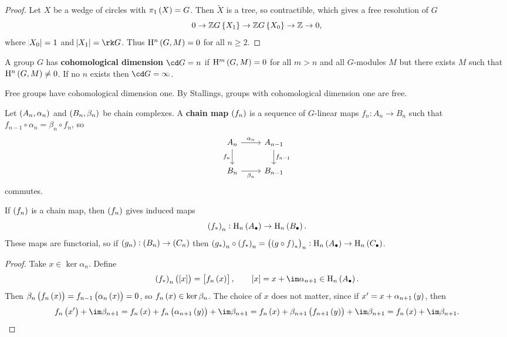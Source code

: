 \begin{proof}
Let $ X $ be a wedge of circles with $ \pi_1\br{X} = G $. Then $ \widetilde{X} $ is a tree, so contractible, which gives a free resolution of $ G $
$$ 0 \to \ZZ G\cbr{X_1} \to \ZZ G\cbr{X_0} \to \ZZ \to 0, $$
where $ \abs{X_0} = 1 $ and $ \abs{X_1} = \rk G $. Thus $ \H^n\br{G, M} = 0 $ for all $ n \ge 2 $.
\end{proof}

\begin{definition}
A group $ G $ has \textbf{cohomological dimension} $ \cd G = n $ if $ \H^m\br{G, M} = 0 $ for all $ m > n $ and all $ G $-modules $ M $ but there exists $ M $ such that $ \H^n\br{G, M} \ne 0 $. If no $ n $ exists then $ \cd G = \infty $.
\end{definition}

Free groups have cohomological dimension one. By Stallings, groups with cohomological dimension one are free.

\begin{definition}
Let $ \br{A_n, \alpha_n} $ and $ \br{B_n, \beta_n} $ be chain complexes. A \textbf{chain map} $ \br{f_n} $ is a sequence of $ G $-linear maps $ f_n : A_n \to B_n $ such that $ f_{n - 1} \circ \alpha_n = \beta_n \circ f_n $, so
$$
\begin{tikzcd}
A_n \arrow{r}{\alpha_n} \arrow{d}[swap]{f_n} & A_{n - 1} \arrow{d}{f_{n - 1}} \\
B_n \arrow{r}[swap]{\beta_n} & B_{n - 1}
\end{tikzcd}
$$
commutes.
\end{definition}

\begin{proposition}
If $ \br{f_n} $ is a chain map, then $ \br{f_n} $ gives induced maps
$$ \br{f_*}_n : \H_n\br{A_\bullet} \to \H_n\br{B_\bullet}. $$
These maps are functorial, so if $ \br{g_n} : \br{B_n} \to \br{C_n} $ then $ \br{g_*}_n \circ \br{f_*}_n = \br{\br{g \circ f}_*}_n : \H_n\br{A_\bullet} \to \H_n\br{C_\bullet} $.
\end{proposition}

\begin{proof}
Take $ x \in \ker \alpha_n $. Define
$$ \br{f_*}_n\br{\sbr{x}} = \sbr{f_n\br{x}}, \qquad \sbr{x} = x + \im \alpha_{n + 1} \in \H_n\br{A_\bullet}. $$
Then $ \beta_n\br{f_n\br{x}} = f_{n - 1}\br{\alpha_n\br{x}} = 0 $, so $ f_n\br{x} \in \ker \beta_n $. The choice of $ x $ does not matter, since if $ x' = x + \alpha_{n + 1}\br{y} $, then
$$ f_n\br{x'} + \im \beta_{n + 1} = f_n\br{x} + f_n\br{\alpha_{n + 1}\br{y}} + \im \beta_{n + 1} = f_n\br{x} + \beta_{n + 1}\br{f_{n + 1}\br{y}} + \im \beta_{n + 1} = f_n\br{x} + \im \beta_{n + 1}. $$
\end{proof}

